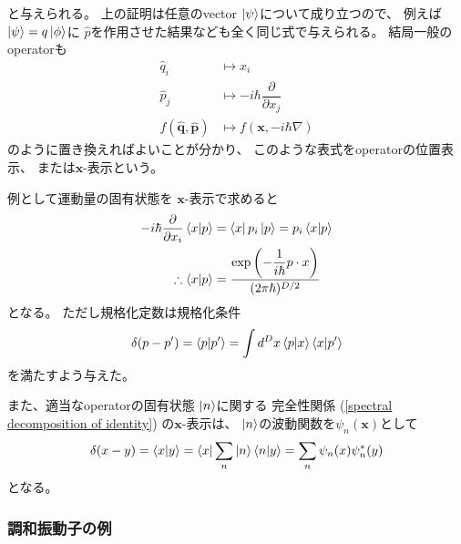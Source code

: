 と与えられる。
上の証明は任意のvector
$\ket{\psi}$について成り立つので、
例えば$\ket{\psi} = q \ket{\phi}$に
$\hat{p}$を作用させた結果なども全く同じ式で与えられる。
結局一般のoperatorも
\begin{subequations}
\begin{align}
    \hat{q}_i
    &\mapsto
    x_i
\\
    \hat{p}_j
    &\mapsto
    - i \hbar
    \dfrac{\partial}{\partial x_j}
\\
    f( \hat{\bm{q}}, \hat{\bm{p}} )
    &\mapsto
    f
    \left( \bm{x}, 
        - i \hbar
        \nabla
    \right)
\end{align}
\end{subequations}
のように置き換えればよいことが分かり、
このような表式をoperatorの位置表示、
または$\bm{x}$-表示という。

例として運動量の固有状態を
$\bm{x}$-表示で求めると
\begin{align}
    - i \hbar
    \dfrac{\partial}{\partial x_i}
    \braket{ x | p }
    &=
    \bra{ x }
    p_i
    \ket{ p }
    =
    p_i
    \braket{ x | p }
\notag\\\therefore
    \braket{ x | p }
    &=
    \dfrac{
        \exp\left(
            -
            \dfrac{1}{i\hbar}
            p \cdot x
        \right)
    }{ (2 \pi \hbar)^{D/2} }
\label{plain wave in qm}
\end{align}
となる。
ただし規格化定数は規格化条件
\begin{align}
    \delta( p - p' )
    =
    \braket{ p | p' }
    =
    \int d^D x
    \braket{ p | x }
    \braket{ x | p' }
\end{align}
を満たすよう与えた。

また、適当なoperatorの固有状態
$\ket{n}$に関する
完全性関係
(\ref{spectral decomposition of identity})
の$\bm{x}$-表示は、
$\ket{n}$の波動関数を$\psi_n( \bm{x} )$として
\begin{align}
    \delta(x - y)
    =
    \braket{ x | y }
    =
    \bra{ x }
        \sum_n
        \ket{n}
        \braket{ n | y }
    =
    \sum_n
    \psi_n( x )
    \psi_n^*( y )
\label{complete set of wave function}
\end{align}
となる。

\subsubsection{調和振動子の例}

